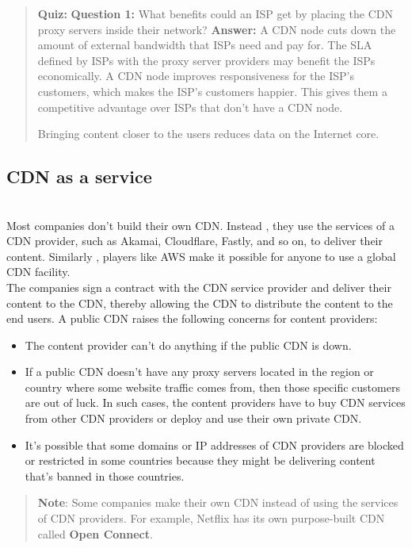 \begin{quote}
\textbf{Quiz:}
\textbf{Question 1:} What benefits could an ISP get by placing the CDN proxy servers inside their network?
\textbf{Answer:} A CDN node cuts down the amount of external bandwidth that ISPs need and pay for. The SLA defined by ISPs with the proxy server providers may benefit the ISPs economically. A CDN node improves responsiveness for the ISP's customers, which makes the ISP's customers happier. This gives them a competitive advantage over ISPs that don't have a CDN node.

Bringing content closer to the users reduces data on the Internet core.
\end{quote}

\subsection{CDN as a service}\label{B1OUCDbXaWcUIaZOZb6ev}
\\
Most companies don't build their own CDN. Instead , they use the services of a CDN provider, such as Akamai, Cloudflare, Fastly, and so on, to deliver their content. Similarly
, players like AWS make it possible for anyone to use a global CDN facility.
\\
The companies sign a contract with the CDN service provider and deliver their content to the CDN, thereby allowing the CDN to distribute the content to the end users. A public CDN raises the following concerns for content providers:

\begin{itemize}
\item
\protect{}\label{X4FgavYB-3W0Ua4_3Wjv_}
The content provider can't do anything if the public CDN is down.
\item
\protect{}\label{3ofu3ZGwNXl3eXr_Ed6oq}
If a public CDN doesn't have any proxy servers located in the region or country where some website traffic comes from, then those specific customers are out of luck. In such cases, the content providers have to buy CDN services from other CDN providers or deploy and use their own private CDN.
\item
\protect{}\label{Hqw76hPacc8FQ0cA0j8VA}
It's possible that some domains or IP addresses of CDN providers are blocked or restricted in some countries because they might be delivering content that's banned in those countries.
\end{itemize}
\begin{quote}
\textbf{Note}: Some companies make their own CDN instead of using the services of CDN providers. For example, Netflix has its own purpose-built CDN called \textbf{Open Connect}.
\end{quote}

